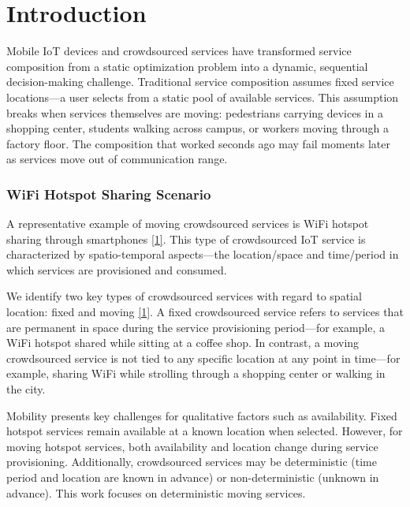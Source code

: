 \section{Introduction}\label{introduction}

Mobile IoT devices and crowdsourced services have transformed service
composition from a static optimization problem into a dynamic,
sequential decision-making challenge. Traditional service composition
assumes fixed service locations---a user selects from a static pool of
available services. This assumption breaks when services themselves are
moving: pedestrians carrying devices in a shopping center, students
walking across campus, or workers moving through a factory floor. The composition that
worked seconds ago may fail moments later as services move out of
communication range.

\hypertarget{wifi-hotspot-sharing-scenario}{%
	\subsubsection{WiFi Hotspot Sharing
		Scenario}\label{wifi-hotspot-sharing-scenario}}

A representative example of moving crowdsourced services is WiFi hotspot
sharing through smartphones \hyperlink{cite.neiat2021}{\hyperlink{cite.neiat2021}{[1]}}. This type of crowdsourced IoT service is
characterized by spatio-temporal aspects---the location/space and
time/period in which services are provisioned and consumed.

We identify two key types of crowdsourced services with regard to
spatial location: fixed and moving \hyperlink{cite.neiat2021}{\hyperlink{cite.neiat2021}{[1]}}. A fixed crowdsourced service refers
to services that are permanent in space during the service provisioning
period---for example, a WiFi hotspot shared while sitting at a coffee
shop. In contrast, a moving crowdsourced service is not tied to any
specific location at any point in time---for example, sharing WiFi while
strolling through a shopping center or walking in the city.

Mobility presents key challenges for qualitative factors such as
availability. Fixed hotspot services remain available at a known
location when selected. However, for moving hotspot services, both
availability and location change during service provisioning.
Additionally, crowdsourced services may be deterministic (time period
and location are known in advance) or non-deterministic (unknown in
advance). This work focuses on deterministic moving services.


